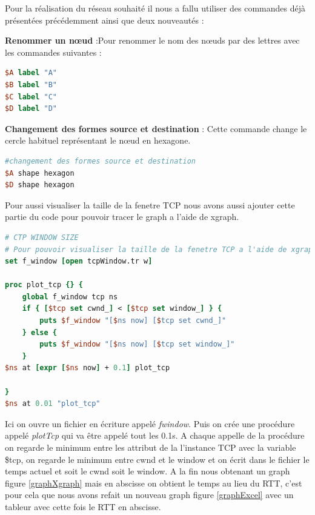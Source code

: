\documentclass[11pt]{article}
\begin{document}
Pour la réalisation du réseau souhaité il nous a fallu utiliser des commandes déjà présentées précédemment ainsi que deux nouveautés :

\textbf{Renommer un nœud} :Pour renommer le nom des nœuds par des lettres avec les commandes suivantes :

\begin{lstlisting}[language=tcl, numbers=none, framexleftmargin=0pt, 	framextopmargin=0pt, framexbottommargin=0pt]
$A label "A"
$B label "B"
$C label "C"
$D label "D"
\end{lstlisting}

\textbf{Changement des formes source et destination} : Cette commande change le cercle habituel représentant le nœud en hexagone.
\begin{lstlisting}[language=tcl, numbers=none, framexleftmargin=0pt, 	framextopmargin=0pt, framexbottommargin=0pt]
#changement des formes source et destination
$A shape hexagon
$D shape hexagon
\end{lstlisting}

Pour aussi visualiser la taille de la fenetre TCP nous avons aussi ajouter cette partie du code pour pouvoir tracer le graph a l'aide de xgraph.

\begin{lstlisting}[language=tcl, numbers=none, framexleftmargin=0pt, 	framextopmargin=0pt, framexbottommargin=0pt]
# CTP WINDOW SIZE
# Pour pouvoir visualiser la taille de la fenetre TCP a l'aide de xgraph
set f_window [open tcpWindow.tr w]

proc plot_tcp {} {
    global f_window tcp ns
    if { [$tcp set cwnd_] < [$tcp set window_] } {
        puts $f_window "[$ns now] [$tcp set cwnd_]"
    } else {
        puts $f_window "[$ns now] [$tcp set window_]"
    }
$ns at [expr [$ns now] + 0.1] plot_tcp

}
$ns at 0.01 "plot_tcp"
\end{lstlisting}

Ici on ouvre un fichier en écriture appelé \textit{fwindow}. Puis on crée une procédure appelé \textit{plotTcp} qui va être appelé tout les 0.1s. A chaque appelle de la procédure on regarde le minimum entre les attribut de la l'instance TCP avec la variable \$tcp, on regarde le minimum entre cwnd et le window et on écrit dans le fichier le temps actuel et soit le cwnd soit le window. A la fin nous obtenant un graph figure \ref{graphXgraph} mais en abscisse on obtient le temps au lieu du RTT, c'est pour cela que nous avons refait un nouveau graph figure \ref{graphExcel} avec un tableur avec cette fois le RTT en abscisse.
\end{document}
